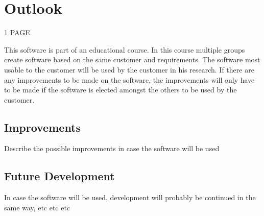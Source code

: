 \chapter{Outlook} %

1 PAGE

This software is part of an educational course. In this course multiple groups create software based on the same customer and requirements. The software most usable to the customer will be used by the customer in his research. If there are any improvements to be made on the software, the improvements will only have to be made if the software is elected amongst the others to be used by the customer.

\section{Improvements}
Describe the possible improvements in case the software will be used

\section{Future Development}
In case the software will be used, development will probably be continued in the same way, etc etc etc
